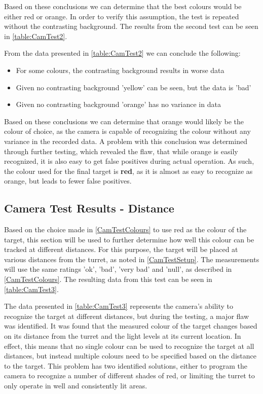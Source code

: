 Based on these conclusions we can determine that the best colours would be
either red or orange. In order to verify this assumption, the test is repeated
without the contrasting background. The results from the second test can be seen
in \autoref{table:CamTest2}.


From the data presented in \autoref{table:CamTest2} we can conclude the
following:
\begin{itemize}
  \item For some colours, the contrasting background results in worse data
  \item Given no contrasting background 'yellow' can be seen, but the data is
  'bad'
  \item Given no contrasting background 'orange' has no variance in data
\end{itemize}

Based on these conclusions we can determine that orange would likely be
the colour of choice, as the camera is capable of recognizing the colour without
any variance in the recorded data. A problem with this conclusion was determined
through further testing, which revealed the flaw, that while orange is easily
recognized, it is also easy to get false positives during actual operation. As
such, the colour used for the final target is \textbf{red}, as it is almost as
easy to recognize as orange, but leads to fewer false positives.

\subsection{Camera Test Results - Distance}\label{CamTestDistance}
Based on the choice made in \autoref{CamTestColours} to use red as the colour
of the target, this section will be used to further determine how well this
colour can be tracked at different distances. For this purpose, the target will
be placed at various distances from the turret, as noted in \autoref{CamTestSetup}.
The measurements will use the same ratings 'ok', 'bad', 'very bad' and 'null',
as described in \autoref{CamTestColours}. The resulting data from this test can be
seen in \autoref{table:CamTest3}.


The data presented in \autoref{table:CamTest3} represents the camera's ability
to recognize the target at different distances, but during the testing, a major
flaw was identified. It was found that the measured colour of the target
changes based on its distance from the turret and the light levels at its
current location. In effect, this means that no single colour can be used to
recognize the target at all distances, but instead multiple colours need to be
specified based on the distance to the target. This problem has two identified
solutions, either to program the camera to recognize a number of different
shades of red, or limiting the turret to only operate in well and consistently
lit areas.

